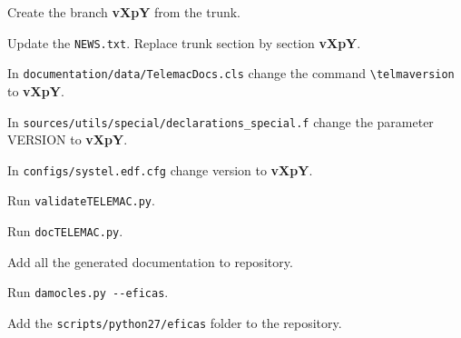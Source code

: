\begin{todolist}
\setlength\itemsep{0.01em}
\item Create the branch \textbf{vXpY} from the trunk.
  \item Update the \verb!NEWS.txt!. Replace trunk section by section
    \textbf{vXpY}.
  \item In \verb!documentation/data/TelemacDocs.cls! change the command
    \verb!\telmaversion! to \textbf{vXpY}.
  \item In \verb!sources/utils/special/declarations_special.f! change the
    parameter VERSION to \textbf{vXpY}.
  \item In \verb!configs/systel.edf.cfg! change version to \textbf{vXpY}.
  \item Run \verb!validateTELEMAC.py!.
  \item Run \verb!docTELEMAC.py!.
  \item Add all the generated documentation to repository.
  \item Run \verb!damocles.py --eficas!.
  \item Add the \verb!scripts/python27/eficas! folder to the repository.
\end{todolist}
